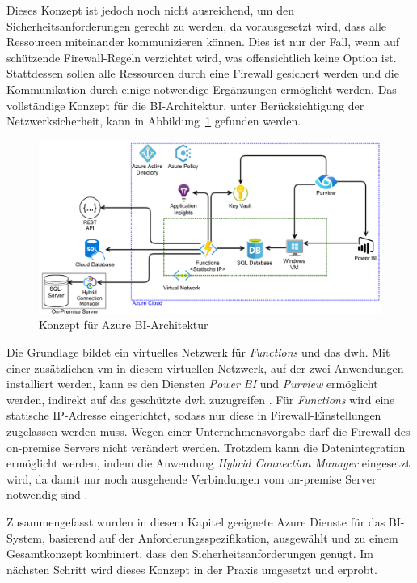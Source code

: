 Dieses Konzept ist jedoch noch nicht ausreichend, um den Sicherheitsanforderungen gerecht zu werden, da vorausgesetzt wird, dass alle Ressourcen miteinander kommunizieren können. Dies ist nur der Fall, wenn auf schützende Firewall-Regeln verzichtet wird, was offensichtlich keine Option ist. Stattdessen sollen alle Ressourcen durch eine Firewall gesichert werden und die Kommunikation durch einige notwendige Ergänzungen ermöglicht werden. Das vollständige Konzept für die BI-Architektur, unter Berücksichtigung der Netzwerksicherheit, kann in Abbildung~\ref{fig:chap03_4_konzeptArchitektur} gefunden werden.
 
 \begin{figure}[htbp]
 \centering
 \includegraphics[width=\textwidth]{gfx/azure/konzept_firewall.pdf}
 \caption{Konzept für Azure BI-Architektur}
\label{fig:chap03_4_konzeptArchitektur}
\end{figure}

Die Grundlage bildet ein virtuelles Netzwerk für \textit{Functions} und das \ac{dwh}. Mit einer zusätzlichen \ac{vm} in diesem virtuellen Netzwerk, auf der zwei Anwendungen installiert werden, kann es den Diensten \textit{Power BI} und \textit{Purview} ermöglicht werden, indirekt auf das geschützte \ac{dwh} zuzugreifen \cite[vgl.][]{gunnarsson_pro_2020, msdoc_22_purviewSHIR}. Für \textit{Functions} wird eine statische IP-Adresse eingerichtet, sodass nur diese in Firewall-Einstellungen zugelassen werden muss. Wegen einer Unternehmensvorgabe darf die Firewall des on-premise Servers nicht verändert werden. Trotzdem kann die Datenintegration ermöglicht werden, indem die Anwendung \textit{Hybrid Connection Manager} eingesetzt wird,  da damit nur noch ausgehende Verbindungen vom on-premise Server notwendig sind \cite[vgl.][]{msdoc_22_func_hybridConn}.

Zusammengefasst wurden in diesem Kapitel geeignete Azure Dienste für das BI-System, basierend auf der Anforderungsspezifikation, ausgewählt und zu einem Gesamtkonzept kombiniert, dass den Sicherheitsanforderungen genügt. Im nächsten Schritt wird dieses Konzept in der Praxis umgesetzt und erprobt.